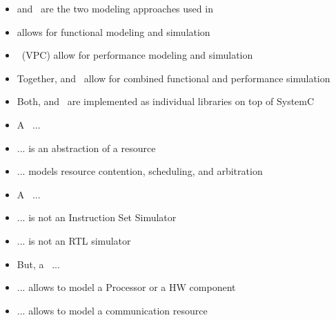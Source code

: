 \begin{frame}[t]
\begin{itemize}
\item \SysteMoC{} and \VPCs\ are the two modeling approaches used in \SystemCoDesigner{}
\end{itemize}
\begin{itemize}
\item \SysteMoC{} allows for functional modeling and simulation
\end{itemize}

\begin{itemize}
\item \VPCs\ (VPC) allow for performance modeling and simulation
\end{itemize}

\begin{itemize}
\item Together, \SysteMoC{} and \VPCs\, allow for combined functional and performance simulation
\end{itemize}

\begin{itemize}
\item Both, \SysteMoC{} and \VPCs\, are implemented as individual libraries on top of SystemC
\end{itemize}

\end{frame}


\begin{frame}[t]
\begin{itemize}
\item A \VPC\ ...
\item ... is an abstraction of a resource
\item ... models resource contention, scheduling, and arbitration
\end{itemize}

\begin{itemize}
\item A \VPC\ ...
\item ... is not an Instruction Set Simulator
\item ... is not an RTL simulator
\end{itemize}

\begin{itemize}
\item But, a \VPC\ ...
\item ... allows to model a Processor or a HW component
\item ... allows to model a communication resource
\end{itemize}

\end{frame}



